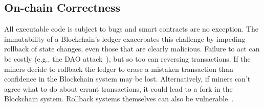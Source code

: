 
\subsection{On-chain Correctness}
All executable code is subject to bugs and smart contracts are no exception.
The immutability of a Blockchain's ledger exacerbates this challenge by impeding rollback of state changes, even those that are clearly malicious.
Failure to act can be costly (e.g., the DAO attack~\cite{dao}), but so too can reversing transactions.
If the miners decide to rollback the ledger to erase a mistaken transaction than confidence in the Blockchain system may be lost.
Alternatively, if miners can't agree what to do about errant transactions, it could lead to a fork in the Blockchain system.
Rollback systems themselves can also be vulnerable~\cite{arxiv:AviSafSha18}.


